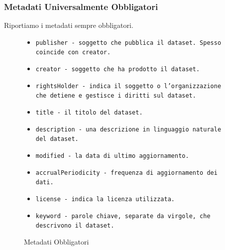\documentclass[8pt]{beamer}
\begin{document}
\begin{frame}
  \frametitle{Metadati Universalmente Obbligatori}

  Riportiamo i metadati sempre obbligatori.
  
  \begin{figure}
    \begin{itemize}[<+->]
      \item \tt{publisher} - soggetto che pubblica il dataset. Spesso coincide con \tt{creator}.
      \item \tt{creator} - soggetto che ha prodotto il dataset.
      \item \tt{rightsHolder} - indica il soggetto o l’organizzazione che detiene e gestisce i diritti sul dataset.
      \item \tt{title} - il titolo del dataset.
      \item \tt{description} - una descrizione in linguaggio naturale del dataset.
      \item \tt{modified} - la data di ultimo aggiornamento.
      \item \tt{accrualPeriodicity} - frequenza di aggiornamento dei dati.
      \item \tt{license} - indica la licenza utilizzata.
      \item \tt{keyword} - parole chiave, separate da virgole, che descrivono il dataset.
    \end{itemize}
    \caption{Metadati Obbligatori}
  \end{figure}
\end{frame}
\end{document}
